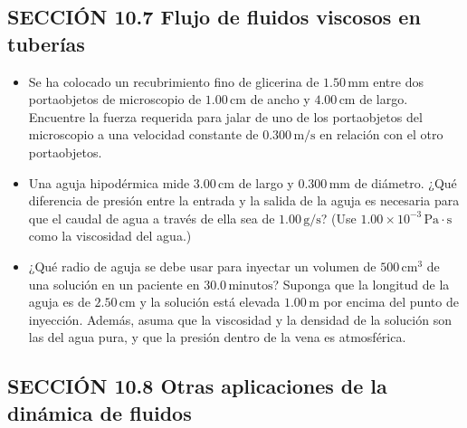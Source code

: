\documentclass[11pt,a4paper]{article}
\begin{document}
\subsection*{SECCIÓN 10.7 Flujo de fluidos viscosos en tuberías}

\begin{itemize}
    \item[\textbf{27.}] Se ha colocado un recubrimiento fino de glicerina de \(1.50\,\text{mm}\) entre dos portaobjetos de microscopio de \(1.00\,\text{cm}\) de ancho y \(4.00\,\text{cm}\) de largo. Encuentre la fuerza requerida para jalar de uno de los portaobjetos del microscopio a una velocidad constante de \(0.300\,\text{m/s}\) en relación con el otro portaobjetos.
    \vspace*{6cm}
    
    \item[\textbf{28.}] Una aguja hipodérmica mide \(3.00\,\text{cm}\) de largo y \(0.300\,\text{mm}\) de diámetro. ¿Qué diferencia de presión entre la entrada y la salida de la aguja es necesaria para que el caudal de agua a través de ella sea de \(1.00\,\text{g/s}\)? (Use \(1.00 \times 10^{-3}\,\text{Pa}\cdot\text{s}\) como la viscosidad del agua.)
    \vspace*{6cm}
\end{itemize}

\newpage

\begin{itemize}
    \item[\textbf{29.}] ¿Qué radio de aguja se debe usar para inyectar un volumen de \(500\,\text{cm}^3\) de una solución en un paciente en \(30.0\,\text{minutos}\)? Suponga que la longitud de la aguja es de \(2.50\,\text{cm}\) y la solución está elevada \(1.00\,\text{m}\) por encima del punto de inyección. Además, asuma que la viscosidad y la densidad de la solución son las del agua pura, y que la presión dentro de la vena es atmosférica.
    \vspace*{7cm}
\end{itemize}

\subsection*{SECCIÓN 10.8 Otras aplicaciones de la dinámica de fluidos}
\end{document}
